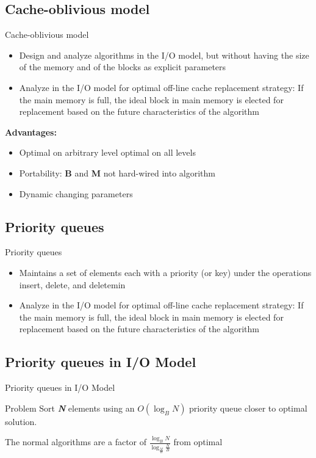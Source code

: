 \documentclass{beamer}
\begin{document}
\begin{darkframes}
    \subsection{Cache-oblivious model}
    \begin{frame}{Cache-oblivious model}
        \begin{itemize}
            \item Design and analyze algorithms in the I/O model, but without having the size of the memory and of the blocks as explicit parameters
            \item Analyze in the I/O model for optimal off-line cache replacement strategy: If the main memory is full, the ideal block in main memory is elected for replacement based on the future characteristics of the algorithm
        \end{itemize}
        \bigskip
        \textbf{Advantages:}
        \begin{itemize}
            \item Optimal on arbitrary level optimal on all levels
            \item Portability: \textbf{B} and \textbf{M} not hard-wired into algorithm
            \item Dynamic changing parameters
        \end{itemize}
    \end{frame}

	\subsection{Priority queues}
    \begin{frame}{Priority queues}
        \begin{itemize}
            \item Maintains a set of elements each with a priority (or key) under the operations insert, delete, and deletemin
            \item Analyze in the I/O model for optimal off-line cache replacement strategy: If the main memory is full, the ideal block in main memory is elected for replacement based on the future characteristics of the algorithm
        \end{itemize}
    \end{frame}
    
	\subsection{Priority queues in I/O Model}
    \begin{frame}{Priority queues in I/O Model}
        \begin{block}{Problem}
        Sort \textbf{\textit{N}} elements using an \(O(\log_B N)\) priority queue closer to optimal solution.
      \end{block}
      \bigskip
      The normal algorithms are a factor of \(\frac{\log_B N}{\log_\frac{M}{B} \frac{N}{B}}\) from optimal
    \end{frame}
    

\end{darkframes}
\end{document}
